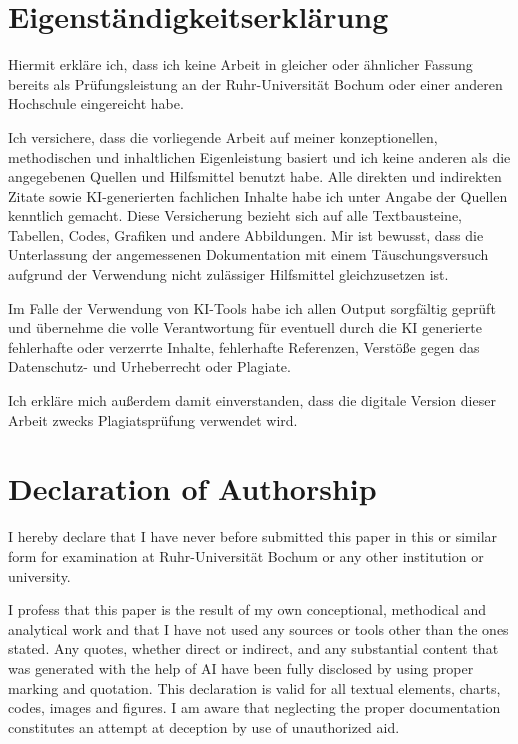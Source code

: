 \section*{Eigenständigkeitserklärung}
{
Hiermit erkläre ich, dass ich keine Arbeit in gleicher oder ähnlicher Fassung bereits als Prüfungsleistung an der Ruhr-Universität Bochum oder einer anderen Hochschule eingereicht habe.

\noindent
Ich versichere, dass die vorliegende Arbeit auf meiner konzeptionellen, methodischen und inhaltlichen Eigenleistung basiert und ich keine anderen als die angegebenen Quellen und Hilfsmittel benutzt habe. Alle direkten und indirekten Zitate sowie KI-generierten fachlichen Inhalte habe ich unter Angabe der Quellen kenntlich gemacht. Diese Versicherung bezieht sich auf alle Textbausteine, Tabellen, Codes, Grafiken und andere Abbildungen. Mir ist bewusst, dass die Unterlassung der angemessenen Dokumentation mit einem Täuschungsversuch aufgrund der Verwendung nicht zulässiger Hilfsmittel gleichzusetzen ist.

\noindent
Im Falle der Verwendung von KI-Tools habe ich allen Output sorgfältig geprüft und übernehme die volle Verantwortung für eventuell durch die KI generierte fehlerhafte oder verzerrte Inhalte, fehlerhafte Referenzen, Verstöße gegen das Datenschutz- und Urheberrecht oder Plagiate.

\noindent
Ich erkläre mich außerdem damit einverstanden, dass die digitale Version dieser Arbeit zwecks Plagiatsprüfung verwendet wird. \@}

\section*{Declaration of Authorship}
I hereby declare that I have never before submitted this paper in this or similar form for examination at Ruhr-Universität Bochum or any other institution or university.

\noindent
I profess that this paper is the result of my own conceptional, methodical and analytical work and that I have not used any sources or tools other than the ones stated.
Any quotes, whether direct or indirect, and any substantial content that was generated with the help of AI have been fully disclosed by using proper marking and quotation.
This declaration is valid for all textual elements, charts, codes, images and figures.
I am aware that neglecting the proper documentation constitutes an attempt at deception by use of unauthorized aid.


